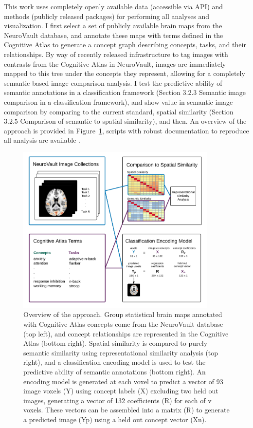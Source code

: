 \documentclass{report}
\begin{document}
This work uses completely openly available data (accessible via API) and
methods (publicly released packages) for performing all analyses and
visualization. I first select a set of publicly available brain maps
from the NeuroVault database, and annotate
these maps with terms defined in the Cognitive Atlas to generate a
concept graph describing concepts, tasks, and their relationships. By way of recently released
infrastructure to tag images with contrasts from the Cognitive Atlas in
NeuroVault, images are immediately mapped to this tree under the
concepts they represent, allowing for a completely semantic-based image
comparison analysis. I test the predictive ability of semantic
annotations in a classification framework (Section 3.2.3 Semantic image
comparison in a classification framework), and show value in semantic
image comparison by comparing to the current standard, spatial
similarity (Section 3.2.5 Comparison of semantic to spatial similarity),
and then. An overview of the approach is provided in Figure~\ref{fig:31}, scripts
with robust documentation to reproduce all analysis are available \cite{Vsoch_undated-mq}.

\begin{figure}[h!]
\begin{center}
\includegraphics[width=10cm]{images/figure31.png}
\end{center}
\caption{ \label{fig:31} Overview of the approach. Group statistical brain maps
annotated with Cognitive Atlas concepts come from the NeuroVault
database (top left), and concept relationships are represented in the
Cognitive Atlas (bottom right). Spatial similarity is compared to purely
semantic similarity using representational similarity analysis (top
right), and a classification encoding model is used to test the
predictive ability of semantic annotations (bottom right). An encoding
model is generated at each voxel to predict a vector of 93 image voxels
(Y) using concept labels (X) excluding two held out images, generating a
vector of 132 coefficients (R) for each of v voxels. These vectors can
be assembled into a matrix (R) to generate a predicted image (Yp) using
a held out concept vector (Xn).
\newline \newline}
\end{figure} 
\end{document}
